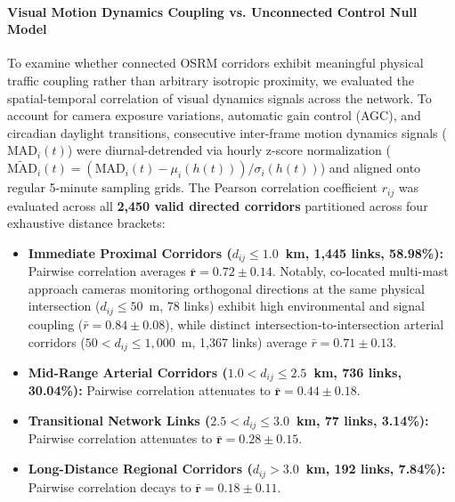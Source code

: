 \documentclass[preprint,12pt]{elsarticle}
\begin{document}
\paragraph{Visual Motion Dynamics Coupling vs. Unconnected Control Null Model}
To examine whether connected OSRM corridors exhibit meaningful physical traffic coupling rather than arbitrary isotropic proximity, we evaluated the spatial-temporal correlation of visual dynamics signals across the network. To account for camera exposure variations, automatic gain control (AGC), and circadian daylight transitions, consecutive inter-frame motion dynamics signals ($\text{MAD}_i(t)$) were diurnal-detrended via hourly z-score normalization ($\widetilde{\text{MAD}}_i(t) = (\text{MAD}_i(t) - \mu_i(h(t))) / \sigma_i(h(t))$) and aligned onto regular 5-minute sampling grids. The Pearson correlation coefficient $r_{ij}$ was evaluated across all \textbf{2,450 valid directed corridors} partitioned across four exhaustive distance brackets:
\begin{itemize}
    \item \textbf{Immediate Proximal Corridors ($d_{ij} \le 1.0$~km, 1,445 links, 58.98\%):} Pairwise correlation averages $\mathbf{\bar{r} = 0.72 \pm 0.14}$. Notably, co-located multi-mast approach cameras monitoring orthogonal directions at the same physical intersection ($d_{ij} \le 50$~m, 78 links) exhibit high environmental and signal coupling ($\bar{r} = 0.84 \pm 0.08$), while distinct intersection-to-intersection arterial corridors ($50 < d_{ij} \le 1,000$~m, 1,367 links) average $\bar{r} = 0.71 \pm 0.13$.
    \item \textbf{Mid-Range Arterial Corridors ($1.0 < d_{ij} \le 2.5$~km, 736 links, 30.04\%):} Pairwise correlation attenuates to $\mathbf{\bar{r} = 0.44 \pm 0.18}$.
    \item \textbf{Transitional Network Links ($2.5 < d_{ij} \le 3.0$~km, 77 links, 3.14\%):} Pairwise correlation attenuates to $\mathbf{\bar{r} = 0.28 \pm 0.15}$.
    \item \textbf{Long-Distance Regional Corridors ($d_{ij} > 3.0$~km, 192 links, 7.84\%):} Pairwise correlation decays to $\mathbf{\bar{r} = 0.18 \pm 0.11}$.
\end{itemize}
\end{document}
